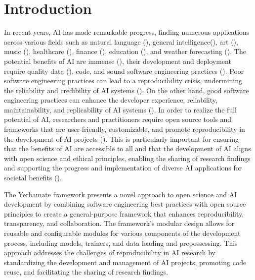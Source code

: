 
\section{Introduction}


 In recent years, AI has made remarkable progress, finding numerous applications across various fields such as natural language (\cite{gpt}), general intelligence(\cite{gato}), art (\cite{diffusion}), music (\cite{musiclm}), healthcare (\cite{aihealthcare}), finance (\cite{bao2022fraudartificial}), education (\cite{aieducation}), and weather forecasting (\cite{weather}). The potential benefits of AI are immense (\cite{beneficialai,potencialaibenefit}), their development and deployment require quality data (\cite{lecun2015deep}), code, and sound software engineering practices (\cite{se4dl,amershi2019software}). Poor software engineering practices can lead to a reproducibility crisis, undermining the reliability and credibility of AI systems (\cite{leakage-recrisis}). On the other hand, good software engineering practices can enhance the developer experience, reliability, maintainability, and replicability of AI systems (\cite{se4dl,amershi2019software, wan2019does}). In order to realize the full potential of AI, researchers and practitioners require open source tools and frameworks that are user-friendly, customizable, and promote reproducibility in the development of AI projects (\cite{lu2022softwareAIReponse,li2018can,wolf2020designing,olson2018system,ong2021guide,gundersen2018reproducible}). This is particularly important for ensuring that the benefits of AI are accessible to all and that the development of AI aligns with open science and ethical principles, enabling the sharing of research findings and supporting the progress and implementation of diverse AI applications for societal benefits (\cite{coro2020open,braun2018open, mittelstadt2016ethics,floridi2018ai4people,ong2021guide}).

The Yerbamate framework presents a novel approach to open science and AI development by combining software engineering best practices with open source principles to create a general-purpose framework that enhances reproducibility, transparency, and collaboration. The framework's modular design allows for reusable and configurable modules for various components of the development process, including models, trainers, and data loading and prepossessing. This approach addresses the challenges of reproducibility in AI research by standardizing the development and management of AI projects, promoting code reuse, and facilitating the sharing of research findings.

